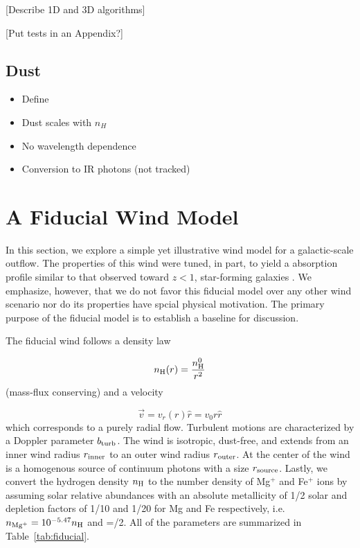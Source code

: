 \documentclass[12pt,preprint]{aastex}
\begin{document}
[Describe 1D and 3D algorithms]

[Put tests in an Appendix?]

\subsection{Dust}
\label{sec:dust_method}

\begin{itemize}
\item Define \taud
\item Dust scales with $n_H$
\item No wavelength dependence
\item Conversion to IR photons (not tracked)
\end{itemize}



\section{A Fiducial Wind Model}
\label{sec:fiducial}

In this section, we explore a simple yet illustrative wind model for
a galactic-scale outflow.  The properties of this wind were tuned, in
part, to yield a  absorption profile 
similar to that observed toward $z<1$, star-forming galaxies
\citep{wcp+09,rubin10b}.  We emphasize, however, that we do not
favor this fiducial model over any other wind scenario nor do its
properties have spcial physical motivation.
The primary purpose of the fiducial model is to establish a baseline
for discussion.

The fiducial wind follows a density law

\begin{equation}
n_{\rm H} (r) = \frac{n^0_{\rm H}}{r^2}
\end{equation}
(mass-flux conserving) and a velocity 

\begin{equation}
\vec v = v_r (r) \hat r = v_0 r \hat r
\label{eqn:vel}
\end{equation}
which corresponds to a purely radial flow.  Turbulent motions are
characterized by a Doppler parameter $b_{\rm turb}$.  
The wind is isotropic, dust-free, and extends from an inner wind
radius $r_{\rm inner}$ to an outer wind radius $r_{\rm outer}$.  At
the center of the wind 
is a homogenous source of continuum photons with a size $r_{\rm source}$.  Lastly,
we convert the hydrogen density $n_{\rm H}$ to the number density of
Mg$^+$ and Fe$^+$ ions by assuming solar relative abundances with an
absolute metallicity of 1/2 solar and depletion factors of 1/10 and
1/20 for Mg and Fe respectively, i.e.\  $n_{\rm Mg^+} = 10^{-5.47} n_{\rm H}$ 
and \nfe=\nmg/2.   
All of the parameters are summarized in Table~\ref{tab:fiducial}.  
\end{document}
